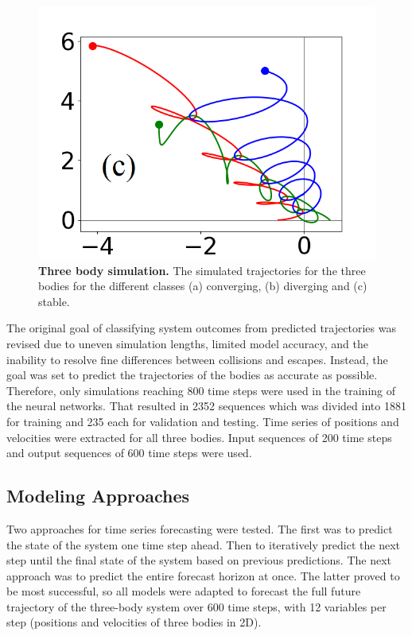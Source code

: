\documentclass[%
 reprint,
 amsmath,amssymb,
 aps,
]{revtex4-2}
\begin{document}
\begin{figure}
\begin{minipage}{0.15723\textwidth}
        \includegraphics[width=\linewidth]{threebodies_13_marked.png}
    \end{minipage}

\caption{\textbf{Three body simulation.} The simulated trajectories for the three bodies for the different classes (a) converging, (b) diverging and (c) stable.}
\label{fig:classes}    
\end{figure}
        

The original goal of classifying system outcomes from predicted trajectories was revised due to uneven simulation lengths, limited model accuracy, and the inability to resolve fine differences between collisions and escapes. Instead, the goal was set to predict the trajectories of the bodies as accurate as possible. Therefore, only simulations reaching 800 time steps were used in the training of the neural networks. That resulted in 2352 sequences which was divided into 1881 for training and 235 each for validation and testing. Time series of positions and velocities were extracted for all three bodies. Input sequences of 200 time steps and output sequences of 600 time steps were used.


\subsection{Modeling Approaches}
Two approaches for time series forecasting were tested. The first was to predict the state of the system one time step ahead. Then to iteratively predict the next step until the final state of the system based on previous predictions. The next approach was to predict the entire forecast horizon at once. The latter proved to be most successful, so all models were adapted to forecast the full future trajectory of the three-body system over 600 time steps, with 12 variables per step (positions and velocities of three bodies in 2D). 
\end{document}
